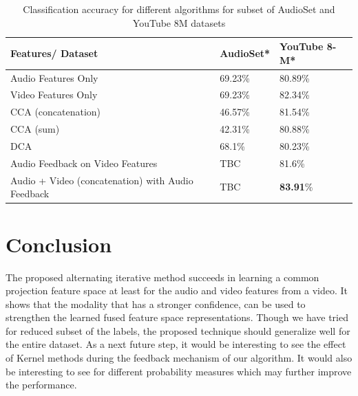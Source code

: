 \documentclass{article}
\begin{document}
\begin{table}[t]
  \caption{Classification accuracy for different algorithms for subset of AudioSet and YouTube 8M datasets}
  \label{results-table}
  \centering
  \begin{tabular}{lll}
    \toprule
    Features/ Dataset & AudioSet* & YouTube 8-M*\\
    \midrule
    Audio Features Only & 69.23\%  &  80.89\%     \\
    Video Features Only    & 69.23\% & 82.34\%      \\
    CCA (concatenation)     &  46.57\% & 81.54\%   \\
    CCA (sum)     &  42.31\% & 80.88\%   \\
    DCA     &68.1\% & 80.23\%   \\
    Audio Feedback on Video Features  &  TBC & 81.6\%   \\
    Audio + Video (concatenation) with Audio Feedback   & TBC & \textbf{83.91}\%   \\
    \bottomrule
  \end{tabular}
\end{table}

\section{Conclusion}
The proposed alternating iterative method succeeds in learning a common projection feature space at least for the audio and video features from a video. It shows that the modality that has a stronger confidence, can be used to strengthen the learned fused feature space representations. Though we have tried for reduced subset of the labels, the proposed technique should generalize well for the entire dataset. As a next future step, it would be interesting to see the effect of Kernel methods during the feedback mechanism of our algorithm. It would also be interesting to see for different probability measures which may further improve the performance.   

\end{document}
